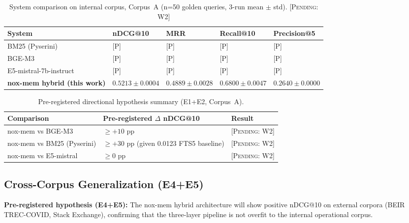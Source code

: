 \documentclass{article}
\begin{document}
\begin{table}[t]
  \caption{System comparison on internal corpus, Corpus~A
    (n=50 golden queries, 3-run mean $\pm$ std). \textsc{[Pending: W2]}}
  \label{tab:external}
  \centering
  \begin{tabular}{lllll}
    \toprule
    System & nDCG@10 & MRR & Recall@10 & Precision@5 \\
    \midrule
    BM25 (Pyserini) \cite{yang2018anserini}              & {[}P{]} & {[}P{]} & {[}P{]} & {[}P{]} \\
    BGE-M3 \cite{chen2024bge}                            & {[}P{]} & {[}P{]} & {[}P{]} & {[}P{]} \\
    E5-mistral-7b-instruct \cite{wang2023improving}      & {[}P{]} & {[}P{]} & {[}P{]} & {[}P{]} \\
    \textbf{nox-mem hybrid (this work)}                  & $\mathbf{0.5213 \pm 0.0004}$ & $0.4889 \pm 0.0028$ & $0.6800 \pm 0.0047$ & $0.2640 \pm 0.0000$ \\
    \bottomrule
  \end{tabular}
\end{table}

\begin{table}[t]
  \caption{Pre-registered directional hypothesis summary (E1+E2, Corpus~A).}
  \label{tab:hypotheses}
  \centering
  \begin{tabular}{lll}
    \toprule
    Comparison & Pre-registered $\Delta$ nDCG@10 & Result \\
    \midrule
    nox-mem vs BGE-M3           & $\geq +10$ pp & \textsc{[Pending: W2]} \\
    nox-mem vs BM25 (Pyserini)  & $\geq +30$ pp (given 0.0123 FTS5 baseline) & \textsc{[Pending: W2]} \\
    nox-mem vs E5-mistral       & $\geq 0$ pp & \textsc{[Pending: W2]} \\
    \bottomrule
  \end{tabular}
\end{table}

\subsection{Cross-Corpus Generalization (E4+E5)}

\textbf{Pre-registered hypothesis (E4+E5):} The nox-mem hybrid architecture will show
positive nDCG@10 on external corpora (BEIR TREC-COVID, Stack Exchange), confirming that
the three-layer pipeline is not overfit to the internal operational corpus.
\end{document}
